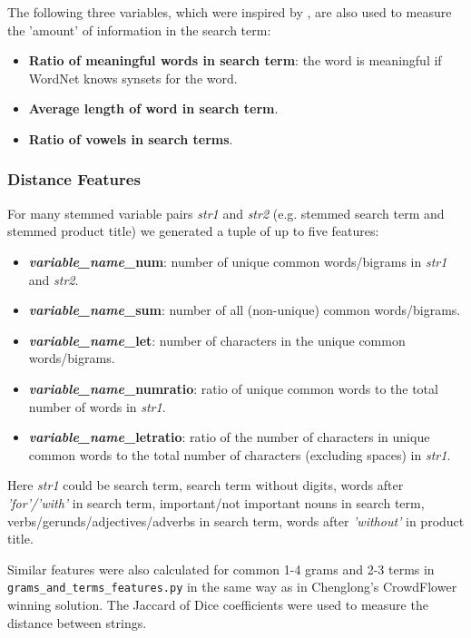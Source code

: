 \documentclass[12pt]{article}
\begin{document}
The following three variables, which were inspired by \cite{dato:beatthebenchmark}, are also used to measure the 'amount' of information in the search term:
\begin{itemize}
\item \textbf{Ratio of meaningful words in search term}: the word is meaningful if WordNet knows synsets for the word.
\item \textbf{Average length of word in search term}.
\item \textbf{Ratio of vowels in search terms}.
\end{itemize}

\subsubsection{Distance Features}
\label{subsubsec:Distance_Features_IandK}
For many stemmed variable pairs \emph{str1} and \emph{str2} (e.g. stemmed search term and stemmed product title) we generated a tuple of up to five features:
\begin{itemize}
\item \textbf{\emph{variable\_name}\_num}: number of unique common words/bigrams in \emph{str1} and \emph{str2}.
\item \textbf{\emph{variable\_name}\_sum}: number of all (non-unique) common words/bigrams.
\item \textbf{\emph{variable\_name}\_let}: number of characters in the unique common words/bigrams.
\item \textbf{\emph{variable\_name}\_numratio}: ratio of unique common words to the total number of words in \emph{str1}.
\item \textbf{\emph{variable\_name}\_letratio}: ratio of the number of characters in unique common words to the total number of characters (excluding spaces) in \emph{str1}.
\end{itemize}
Here \emph{str1} could be search term, search term without digits, words after \emph{'for'/'with'} in search term, important/not important nouns in search term, verbs/gerunds/adjectives/adverbs in search term, words after \emph{'without'} in product title.

Similar features were also calculated for common 1-4 grams and 2-3 terms in \texttt{grams\_and\_terms\_features.py} in the same way as in Chenglong's CrowdFlower winning solution. The Jaccard of Dice coefficients were used to measure the distance between strings.
\end{document}
